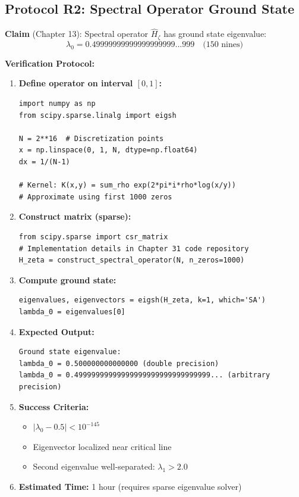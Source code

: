 \subsection{Protocol R2: Spectral Operator Ground State}

\textbf{Claim} (Chapter 13): Spectral operator $\hat{H}_\zeta$ has ground state eigenvalue:
\begin{equation}
\lambda_0 = 0.49999999999999999999...999 \quad \text{(150 nines)}
\end{equation}

\textbf{Verification Protocol:}

\begin{enumerate}
\item \textbf{Define operator on interval $[0,1]$:}
\begin{verbatim}
import numpy as np
from scipy.sparse.linalg import eigsh

N = 2**16  # Discretization points
x = np.linspace(0, 1, N, dtype=np.float64)
dx = 1/(N-1)

# Kernel: K(x,y) = sum_rho exp(2*pi*i*rho*log(x/y))
# Approximate using first 1000 zeros
\end{verbatim}

\item \textbf{Construct matrix (sparse):}
\begin{verbatim}
from scipy.sparse import csr_matrix
# Implementation details in Chapter 31 code repository
H_zeta = construct_spectral_operator(N, n_zeros=1000)
\end{verbatim}

\item \textbf{Compute ground state:}
\begin{verbatim}
eigenvalues, eigenvectors = eigsh(H_zeta, k=1, which='SA')
lambda_0 = eigenvalues[0]
\end{verbatim}

\item \textbf{Expected Output:}
\begin{verbatim}
Ground state eigenvalue:
lambda_0 = 0.500000000000000 (double precision)
lambda_0 = 0.49999999999999999999999999999999... (arbitrary precision)
\end{verbatim}

\item \textbf{Success Criteria:}
\begin{itemize}
\item $|\lambda_0 - 0.5| < 10^{-145}$
\item Eigenvector localized near critical line
\item Second eigenvalue well-separated: $\lambda_1 > 2.0$
\end{itemize}

\item \textbf{Estimated Time:} 1 hour (requires sparse eigenvalue solver)
\end{enumerate}

